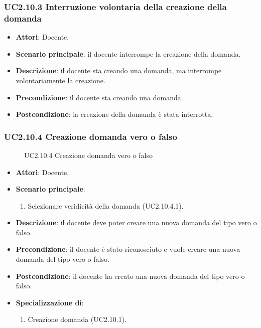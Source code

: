 \subsubsection{UC2.10.3 Interruzione volontaria della creazione della domanda}
\begin{itemize}
\item \textbf{Attori}: Docente.
\item \textbf{Scenario principale}: il docente interrompe la creazione della domanda.
\item \textbf{Descrizione}: il docente sta creando una domanda, ma interrompe volontariamente la creazione.
\item \textbf{Precondizione}: il docente sta creando una domanda.
\item \textbf{Postcondizione}: la creazione della domanda è stata interrotta.
\end{itemize}
\subsubsection{UC2.10.4 Creazione domanda vero o falso}
\begin{figure}[H]
\centering
\noindent{}
\caption{UC2.10.4 Creazione domanda vero o falso}
\end{figure}
\begin{itemize}
\item \textbf{Attori}: Docente.
\item \textbf{Scenario principale}:
\begin{enumerate}
\item Selezionare veridicità della domanda (UC2.10.4.1).
\end{enumerate}
\item \textbf{Descrizione}: il docente deve poter creare una nuova domanda del tipo vero o falso.
\item \textbf{Precondizione}: il docente è stato riconosciuto e vuole creare una nuova domanda del tipo vero o falso.
\item \textbf{Postcondizione}: il docente ha creato una nuova domanda del tipo vero o falso.
\item \textbf{Specializzazione di}:
\begin{enumerate}
\item Creazione domanda (UC2.10.1).
\end{enumerate}
\end{itemize}
